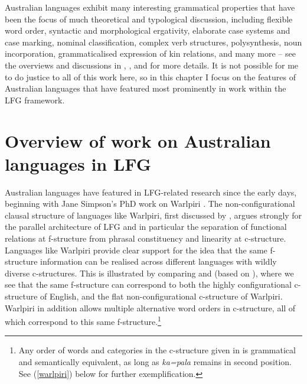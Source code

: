 \documentclass[output=paper,hidelinks]{langscibook}
\begin{document}
Australian languages exhibit many interesting grammatical properties that have been the focus of much theoretical and typological discussion, including flexible word order, syntactic and morphological ergativity, elaborate case systems and case marking, nominal classification, complex verb structures, polysynthesis, noun incorporation, grammaticalised expression of kin relations, and many more -- see the overviews and discussions in \citet{Dixon2002}, \citet{KochNord14}, and \citet{BowernOzlges} for more details. It is not possible for me to do justice to all of this work here, so in this chapter I focus on the features of Australian languages that have featured most prominently in work within the LFG framework.

\section{Overview of work on Australian languages in LFG}
\label{sec:overview}
Australian languages have featured in LFG-related research since the early days, beginning with Jane Simpson's PhD work on Warlpiri \citep{Simpson1983}. The non-configurational clausal structure of languages like Warlpiri, first discussed by \citet{Hale81,Hale82,Hale83}, argues strongly for the parallel architecture of LFG and in particular the separation of functional relations at f-structure from phrasal constituency and linearity at c-structure. Languages like Warlpiri provide clear support for the idea that the same f-structure information can be realised across different languages with wildly diverse c-structures. This is illustrated by comparing  and  (based on \citealt[3--4]{BresnanEtAl2016}), where we see that the same f-structure can correspond to both the highly configurational c-structure of English, and the flat non-configurational c-structure of Warlpiri. Warlpiri in addition allows multiple alternative word orders in c-structure, all of which correspond to this same f-structure.\footnote{Any order of words and categories in the c-structure given in  is grammatical and semantically equivalent, as long as {\it ka=pala} remains in second position. See (\ref{warlpiri}) below for further exemplification.}  
\end{document}
